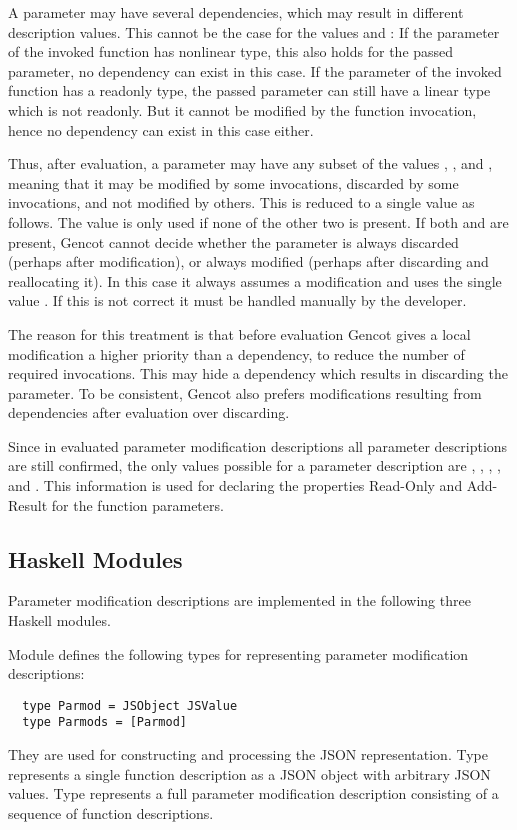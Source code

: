A parameter may have several dependencies, which may result in different description values. This cannot be the case for
the values  and : If the parameter of the invoked function has nonlinear type, this
also holds for the passed parameter, no dependency can exist in this case. If the parameter of the invoked function has
a readonly type, the passed parameter can still have a linear type which is not readonly. But it cannot be modified by the
function invocation, hence no dependency can exist in this case either.

Thus, after evaluation, a parameter may have any subset of the values , , and , meaning 
that it may be modified by some invocations, discarded by some invocations, and not modified by others. This is reduced to
a single value as follows. The value  is only used if none of the other two is present. If both 
and  are present, Gencot cannot decide whether the parameter is always discarded (perhaps after modification),
or always modified (perhaps after discarding and reallocating it). In this case it always assumes a modification and
uses the single value . If this is not correct it must be handled manually by the developer.

The reason for this treatment is that before evaluation Gencot gives a local modification a higher priority than a dependency,
to reduce the number of required invocations. This may hide a dependency which results in discarding the parameter. To
be consistent, Gencot also prefers modifications resulting from dependencies after evaluation over discarding. 

Since in evaluated parameter modification descriptions all parameter descriptions are still confirmed, the only values
possible for a parameter description are , , , , and .
This information is used for declaring the properties Read-Only and Add-Result for the function parameters.

\subsection{Haskell Modules}
\label{impl-parmod-modules}

Parameter modification descriptions are implemented in the following three Haskell modules.

Module  defines the following types for representing parameter modification descriptions:
\begin{verbatim}
  type Parmod = JSObject JSValue
  type Parmods = [Parmod]
\end{verbatim}
They are used for constructing and processing the JSON representation. Type  represents a single
function description as a JSON object with arbitrary JSON values. Type  represents a full parameter modification
description consisting of a sequence of function descriptions.

